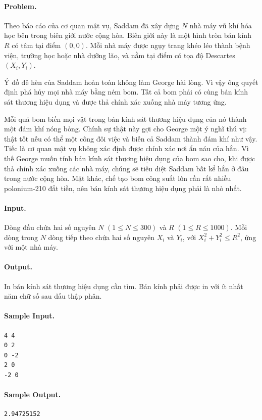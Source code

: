 \documentclass[11pt]{article}
\begin{document}
\paragraph{Problem.}
Theo báo cáo của cơ quan mật vụ, Saddam đã xây dựng \(N\) nhà máy vũ khí hóa
học bên trong biên giới nước cộng hòa. Biên giới này là một hình tròn bán kính
\(R\) có tâm tại điểm \((0,0)\). Mỗi nhà máy được ngụy trang khéo léo thành
bệnh viện, trường học hoặc nhà dưỡng lão, và nằm tại điểm có tọa độ Descartes
\((X_i,Y_i)\).

Ý đồ đê hèn của Saddam hoàn toàn không làm George hài lòng. Vì vậy ông quyết
định phá hủy mọi nhà máy bằng ném bom. Tất cả bom phải có cùng bán kính sát
thương hiệu dụng và được thả chính xác xuống nhà máy tương ứng.

Mỗi quả bom biến mọi vật trong bán kính sát thương hiệu dụng của nó thành một
đám khí nóng bỏng. Chính sự thật này gợi cho George một ý nghĩ thú vị: thật
tốt nếu có thể một công đôi việc và biến cả Saddam thành đám khí như vậy. Tiếc
là cơ quan mật vụ không xác định được chính xác nơi ẩn náu của hắn. Vì thế
George muốn tính bán kính sát thương hiệu dụng của bom sao cho, khi được thả
chính xác xuống các nhà máy, chúng sẽ tiêu diệt Saddam bất kể hắn ở đâu trong
nước cộng hòa. Mặt khác, chế tạo bom công suất lớn cần rất nhiều polonium-210
đắt tiền, nên bán kính sát thương hiệu dụng phải là nhỏ nhất.

\paragraph{Input.}
Dòng đầu chứa hai số nguyên \(N\) \((1\le N\le 300)\) và \(R\)
\((1\le R\le 1000)\). Mỗi dòng trong \(N\) dòng tiếp theo chứa hai số nguyên
\(X_i\) và \(Y_i\), với \(X_i^2+Y_i^2\le R^2\), ứng với một nhà máy.

\paragraph{Output.}
In bán kính sát thương hiệu dụng cần tìm. Bán kính phải được in với ít nhất
năm chữ số sau dấu thập phân.

\paragraph{Sample Input.}
\begin{verbatim}
4 4
0 2
0 -2
2 0
-2 0
\end{verbatim}

\paragraph{Sample Output.}
\begin{verbatim}
2.94725152
\end{verbatim}
\end{document}
